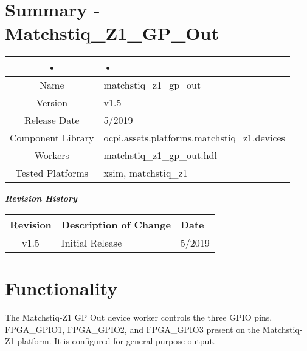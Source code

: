 \documentclass{article}
\author{} %
\date{Version \docVersion} %
\title{\docTitle}
\begin{document}
\section*{Summary - Matchstiq\_Z1\_GP\_Out}
	\begin{tabular}{|c|M{13.5cm}|}
		\hline
		• & • \\
		\hline
		Name & matchstiq\_z1\_gp\_out \\
		\hline
		Version & v1.5 \\
		\hline
		Release Date & 5/2019 \\
		\hline
		Component Library & ocpi.assets.platforms.matchstiq\_z1.devices \\
		\hline
		Workers & matchstiq\_z1\_gp\_out.hdl \\
		\hline
		Tested Platforms & xsim, matchstiq\_z1 \\
		\hline
	\end{tabular}
	
\begin{center}
	\textit{\textbf{Revision History}}
		\begin{table}[H]
		\label{table:revisions} %
			\begin{tabularx}{\textwidth}{|c|X|l|}
			\hline
			\rowcolor{blue}
			\textbf{Revision} & \textbf{Description of Change} & \textbf{Date} \\
		    \hline
		    v1.5 & Initial Release & 5/2019 \\
		    \hline
			\end{tabularx}
		\end{table}
	\end{center}	
	
\section*{Functionality}
\begin{flushleft}
The Matchstiq-Z1 GP Out device worker controls the three GPIO pins, FPGA\_GPIO1, FPGA\_GPIO2, and FPGA\_GPIO3 present on the Matchstiq-Z1 platform. It is configured for general purpose output.

\end{flushleft}
\end{document}
